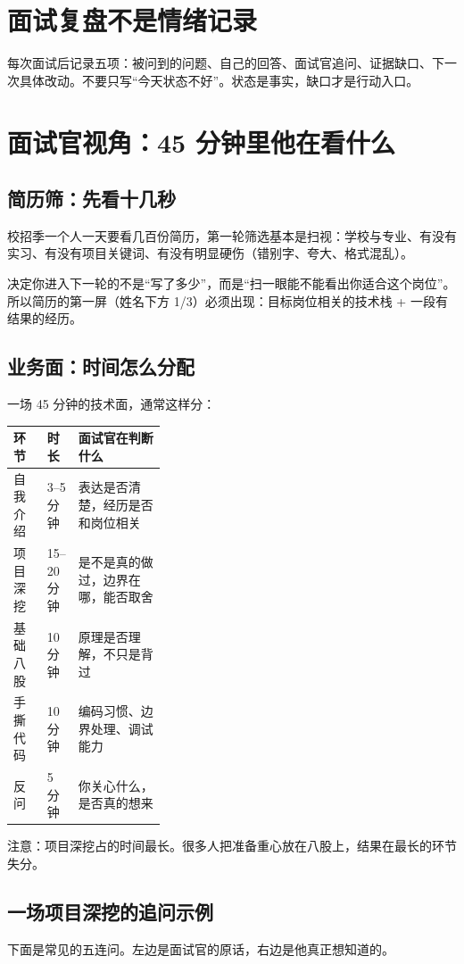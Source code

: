 \documentclass[UTF8,zihao=5,openany]{ctexbook}
\begin{document}
\section{面试复盘不是情绪记录}
每次面试后记录五项：被问到的问题、自己的回答、面试官追问、证据缺口、下一次具体改动。不要只写“今天状态不好”。状态是事实，缺口才是行动入口。

\section{面试官视角：45 分钟里他在看什么}
\subsection{简历筛：先看十几秒}
校招季一个人一天要看几百份简历，第一轮筛选基本是扫视：学校与专业、有没有实习、有没有项目关键词、有没有明显硬伤（错别字、夸大、格式混乱）。

决定你进入下一轮的不是“写了多少”，而是“扫一眼能不能看出你适合这个岗位”。所以简历的第一屏（姓名下方 1/3）必须出现：目标岗位相关的技术栈 + 一段有结果的经历。

\subsection{业务面：时间怎么分配}
一场 45 分钟的技术面，通常这样分：

\begin{center}\small
\begin{tabularx}{\linewidth}{p{0.22\linewidth}p{0.12\linewidth}Y}
\toprule
环节 & 时长 & 面试官在判断什么 \\
\midrule
自我介绍 & 3--5 分钟 & 表达是否清楚，经历是否和岗位相关 \\
项目深挖 & 15--20 分钟 & 是不是真的做过，边界在哪，能否取舍 \\
基础八股 & 10 分钟 & 原理是否理解，不只是背过 \\
手撕代码 & 10 分钟 & 编码习惯、边界处理、调试能力 \\
反问 & 5 分钟 & 你关心什么，是否真的想来 \\
\bottomrule
\end{tabularx}
\end{center}

注意：项目深挖占的时间最长。很多人把准备重心放在八股上，结果在最长的环节失分。

\subsection{一场项目深挖的追问示例}
下面是常见的五连问。左边是面试官的原话，右边是他真正想知道的。
\end{document}
